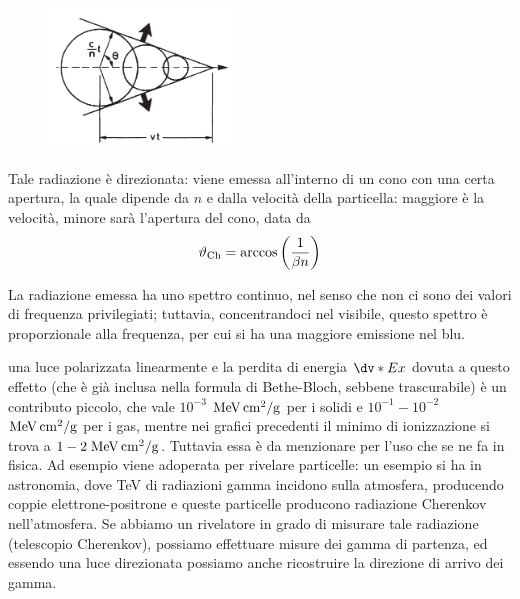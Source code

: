 \begin{minipage}{0.395\textwidth}
    \begin{figure}[H]
        \centering
        \includegraphics[width=5cm]{immagini/Effetto_Cherenkov.png}
    \end{figure}
\end{minipage}
\begin{minipage}{0.6\textwidth}
    \vspace{0.6cm}Tale radiazione è direzionata: viene emessa all'interno di un cono con una certa apertura, la quale dipende da $n$ e dalla velocità della particella: maggiore è la velocità, minore sarà l'apertura del cono, data da
    \begin{equation*}
        \vartheta_{\rm Ch}
        =\arccos{\left(\frac{1}{\beta n}\right)}
    \end{equation*}
\end{minipage}

\vspace{0.2cm}La radiazione emessa ha uno spettro continuo, nel senso che non ci sono dei valori di frequenza privilegiati; tuttavia, concentrandoci nel visibile, questo spettro è proporzionale alla frequenza, per cui si ha una maggiore emissione nel blu.

\E una luce polarizzata linearmente e la perdita di energia $\dv*{E}{x}$ dovuta a questo effetto (che è già inclusa nella formula di Bethe-Bloch, sebbene trascurabile) è un contributo piccolo, che vale $10^{-3}$ $\rm MeV \, cm^2/g$ per i solidi e $10^{-1}-10^{-2}$ $\rm MeV \, cm^2/g$ per i gas, mentre nei grafici precedenti il minimo di ionizzazione si trova a $1-2 \; \rm MeV \, cm^2/g$. Tuttavia essa è da menzionare per l'uso che se ne fa in fisica. Ad esempio viene adoperata per rivelare particelle: un esempio si ha in astronomia, dove TeV di radiazioni gamma incidono sulla atmosfera, producendo coppie elettrone-positrone e queste particelle producono radiazione Cherenkov nell'atmosfera. Se abbiamo un rivelatore in grado di misurare tale radiazione (telescopio Cherenkov), possiamo effettuare misure dei gamma di partenza, ed essendo una luce direzionata possiamo anche ricostruire la direzione di arrivo dei gamma.

